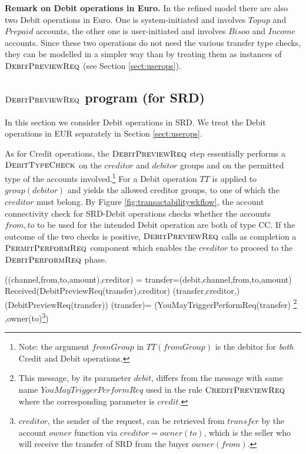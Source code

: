 {\bf Remark on Debit operations in Euro.} In the refined model there are also two Debit operations in Euro. One is system-initiated and involves $Topup$ and $Prepaid$ accounts, the other one is user-initiated  and involves $Bisoo$ and $Income$ accounts. Since these two operations do not need the various transfer type checks, they can be modelled in a simpler way than by treating them as instances of $\hbox{\sc DebitPreviewReq}$ (see Section \ref{sect:userops}).

\subsection{$\hbox{\sc DebitPreviewReq}$ program (for SRD)}
\label{sect:debitpreview}

In this section we consider Debit operations in SRD. We treat the Debit operations in EUR separately in Section \ref{sect:userops}.

As for Credit operations, the $\hbox{\sc DebitPreviewReq}$ step essentially performs a $\hbox{\sc DebitTypeCheck}$ on the $creditor$ and $debitor$ groups and on the permitted type of the accounts involved.\footnote{Note: the argument $fromGroup$ in $TT(fromGroup)$ is the debitor for \emph{both} Credit and Debit operations.} For a Debit operation $TT$ is applied to  $group(debitor)$ and yields the allowed creditor groups, to one of which the $creditor$ must belong. By Figure \ref{fig:transactabilitywkflow}, the account connectivity check for SRD-Debit operations checks whether the accounts $from,to$ to be used for the intended Debit operation are both of type CC. If the outcome of the two checks is positive, $\hbox{\sc DebitPreviewReq}$ calls as completion a $\hbox{\sc PermitPerformReq}$ component which enables the $creditor$ to proceed to the $\hbox{\sc DebitPerformReq}$ phase. 


\begin{asm}
((channel,from,to,amount),creditor)  =\+
  \LET transfer=(debit,channel,from,to,amount)\\
  \IF Received(DebitPreviewReq(transfer),\FROM creditor) \THEN \+   
          (transfer,creditor,)\\
      (DebitPreviewReq(transfer)) \dec\-
\WHERE \+
(transfer)=\+
(YouMayTriggerPerformReq(transfer)
\footnote{This message,  by its parameter $debit$, differs 
	from the message with same name $YouMayTriggerPerformReq$ used in the rule $\hbox{\sc CreditPreviewReq}$ where the corresponding parameter is $credit$.}
,\TO  owner(to)\footnote{$creditor$, the sender of the 
	request, can be retrieved from $transfer$ by the account $owner$ function via $creditor=owner(to)$, which is the seller who will receive the transfer of SRD from the buyer $owner(from)$.}) 
\end{asm}

